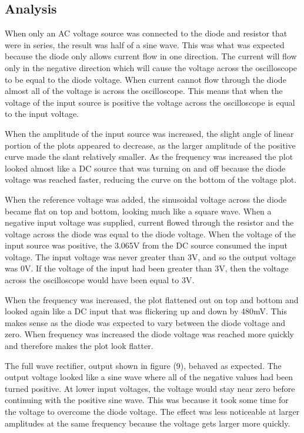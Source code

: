 \documentclass[twocolumn, amsmath]{revtex4}
\begin{document}
 
\subsection{Analysis}
When only an AC voltage source was connected to the diode and resistor that were in series, the result was half of a sine wave. This was what was expected because the diode only allows current flow in one direction. The current will flow only in the negative direction which will cause the voltage across the oscilloscope to be equal to the diode voltage. When current cannot flow through the diode almost all of the voltage is across the oscilloscope. This means that when the voltage of the input source is positive the voltage across the oscilloscope is equal to the input voltage. 

When the amplitude of the input source was increased, the slight angle of linear portion of the plots appeared to decrease, as the larger amplitude of the positive curve made the slant relatively smaller. As the frequency was increased the plot looked almost like a DC source that was turning on and off because the diode voltage was reached faster, reducing the curve on the bottom of the voltage plot.

When the reference voltage was added, the sinusoidal voltage across the diode became flat on top and bottom, looking much like a square wave. When a negative input voltage was supplied, current flowed through the resistor and the voltage across the diode %
 was equal to the diode voltage. When the voltage of the input source was positive, the 3.065V from the DC source consumed the input voltage. The input voltage was never greater than 3V, and so the output voltage was 0V. If the voltage of the input had been greater than 3V, then the voltage across the oscilloscope would have been equal to 3V.

When the frequency was increased, the plot flattened out on top and bottom and looked again like a DC input that was flickering up and down by 480mV. This makes sense as the diode was expected to vary between the diode voltage and zero. When frequency was increased the diode voltage was reached more quickly and therefore makes the plot look flatter.

The full wave rectifier, output shown in figure (9), behaved as expected. The output voltage looked like a sine wave where all of the negative values had been turned positive. At lower input voltages, the voltage would stay near zero before continuing with the positive sine wave. This was because it took some time for the voltage to overcome the diode voltage. The effect was less noticeable at larger amplitudes at the same frequency because the voltage gets larger more quickly.
\end{document}
